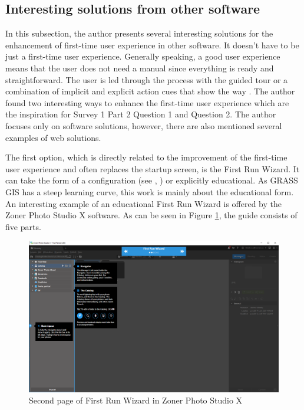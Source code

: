 \documentclass[a4paper,10pt,twoside]{article}
\begin{document}
\newpage
\vspace*{-1cm}
\subsection{Interesting solutions from other software}
\label{sec:other_software}

In this subsection, the author presents several interesting solutions
for the enhancement of first-time user experience in other
software. It doesn't have to be just a first-time user
experience. Generally speaking, a good user experience means that the
user does not need a manual since everything is ready and
straightforward. The user is led through the process with the guided
tour or a combination of implicit and explicit action cues that show
the way \cite{ftue2}. The author found two interesting ways to enhance
the first-time user experience which are the inspiration for Survey 1
Part 2 Question 1 and Question 2. The author focuses only on software
solutions, however, there are also mentioned several examples of web
solutions.

The first option, which is directly related to the improvement of the
first-time user experience and often replaces the startup screen, is
the First Run Wizard. It can take the form of a configuration (see
\cite{lansweeper}, \cite{jetbrains}) or explicitly educational. As
GRASS GIS has a steep learning curve, this work is mainly about the
educational form. An interesting example of an educational First Run
Wizard is offered by the Zoner Photo Studio X software. As can be seen
in Figure \ref{fig:zoner}, the guide consists of five parts.

\vspace{0.3cm}
\begin{figure}[hbt!] 
\begin{center}
\includegraphics[width=17cm]{../pictures/zoner_first_run_2.png} 
\caption[Second page of First Run Wizard in Zoner Photo Studio X]{Second page of First Run Wizard in Zoner Photo Studio X}
\label{fig:zoner}
\end{center}
\end{figure}
\end{document}
